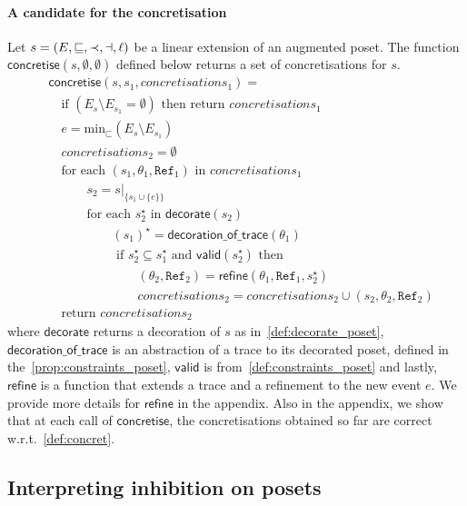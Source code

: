 \paragraph{A candidate for the concretisation}
Let $s = (E,\sqsubseteq,\prec,\dashv,\ell)$ be a linear extension of an augmented poset. The function $\mathsf{concretise}(s,\emptyset,\emptyset)$ defined below returns a set of concretisations for $s$.
\begin{align*}
  &\mathsf{concretise}(s,s_1,\mathit{concretisations}_1) = \\
  &\quad\text{if }(E_s\setminus E_{s_1} = \emptyset)\text{ then return }\mathit{concretisations}_1\\
  &\quad e = \text{min}_{\sqsubset}(E_s\setminus E_{s_1})\\
  &\quad\mathit{concretisations}_2 = \emptyset \\
  &\quad\text{for each }(s_1,\theta_1,\mathtt{Ref}_1)\text{ in }\mathit{concretisations}_1\\
  &\quad\qquad s_2 = s|_{\{s_1\cup\{e\}\}}\\
  &\quad\qquad\text{for each }s_2^{\star}\text{ in }\mathsf{decorate}(s_2)\\
  &\quad\qquad\qquad (s_1)^{\star} = \mathsf{decoration\_of\_trace}(\theta_1)\\
  &\quad\qquad\qquad \text{ if }s_2^{\star}\subseteq s_1^{\star}\text{ and }\mathsf{valid}(s_2^{\star})\text{ then }\\
  &\quad\qquad\qquad\qquad (\mathit{\theta_2},\mathtt{Ref}_2) = \mathsf{refine}(\theta_1,\mathtt{Ref}_1,s_2^{\star})\\
  &\quad\qquad\qquad\qquad \mathit{concretisations}_2 = \mathit{concretisations}_2 \cup (s_2,\mathit{\theta_2},\mathtt{Ref}_2)\\
  &\quad\text{return }\mathit{concretisations}_2
\end{align*}
where $\mathsf{decorate}$ returns a decoration of $s$ as in~\autoref{def:decorate_poset}, $\mathsf{decoration\_of\_trace}$ is an abstraction of a trace to its decorated poset, defined in the~\autoref{prop:constraints_poset}, $\mathsf{valid}$ is from~\autoref{def:constraints_poset} and lastly, $\mathsf{refine}$ is a function that extends a trace and a refinement to the new event $e$. We provide more details for $\mathsf{refine}$ in the appendix. Also in the appendix, we show that at each call of $\mathsf{concretise}$, the concretisations obtained so far are correct w.r.t.~\autoref{def:concret}.

\subsection{Interpreting inhibition on posets}
\label{sec:inhibition}

